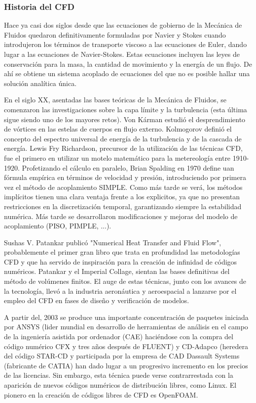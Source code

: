 \subsubsection{Historia del CFD}\label{header-n15}

Hace ya casi dos siglos desde que las ecuaciones de gobierno de la
Mecánica de Fluidos quedaron definitivamente formuladas por Navier y
Stokes cuando introdujeron los términos de transporte viscoso a las
ecuaciones de Euler, dando lugar a las ecuaciones de Navier-Stokes.
Estas ecuaciones incluyen las leyes de conservación para la masa, la
cantidad de movimiento y la energía de un flujo. De ahí se obtiene un
sistema acoplado de ecuaciones del que no es posible hallar una solución
analítica única.

En el siglo XX, asentadas las bases teóricas de la Mecánica de Fluidos,
se comenzaron las investigaciones sobre la capa límite y la turbulencia
(esta última sigue siendo uno de los mayores retos). Von Kárman estudió
el desprendimiento de vórtices en las estelas de cuerpos en flujo
externo. Kolmogorov definió el concepto del espectro universal de
energía de la turbulencia y de la cascada de energía. Lewis Fry
Richardson, precursor de la utilización de las técnicas CFD, fue el
primero en utilizar un motelo matemático para la metereología entre
1910-1920. Profetizando el cálculo en paralelo, Brian Spalding en 1970
define uan fórmula empírica en términos de velocidad y presión,
introduciendo por primera vez el método de acoplamiento SIMPLE. Como más
tarde se verá, los métodos implícitos tienen una clara ventaja frente a
los explicitos, ya que no presentan restricciones en la discretización
temporal, garantizando siempre la estabilidad numérica. Más tarde se
desarrollaron modificaciones y mejoras del modelo de acoplamiento (PISO,
PIMPLE, ...).

Sushas V. Patankar publicó "Numerical Heat Transfer and Fluid Flow",
probablemente el primer gran libro que trata en profundidad las
metodologías CFD y que ha servido de inspiración para la creación de
infinidad de códigos numéricos. Patankar y el Imperial Collage, sientan
las bases definitivas del método de volúmenes finitos. El auge de estas
técnicas, junto con los avances de la tecnología, llevó a la industria
aeronáutica y aeroespacial a lanzarse por el empleo del CFD en fases de
diseño y verificación de modelos.

A partir del, 2003 se produce una importante concentración de paquetes
iniciada por ANSYS (lider mundial en desarrollo de herramientas de
análisis en el campo de la ingeniería asistida por ordenador (CAE)
haciéndose con la compra del código numérico CFX y tres años después de
FLUENT) y CD-Adapco (heredera del código STAR-CD y participada por la
empresa de CAD Dassault Systems (fabricante de CATIA) han dado lugar a
un progresivo incremento en los precios de las licencias. Sin embargo,
esta técnica puede verse contrarrestada con la aparición de nuevos
códigos numéricos de distribución libres, como Linux. El pionero en la
creación de códigos libres de CFD es OpenFOAM.

